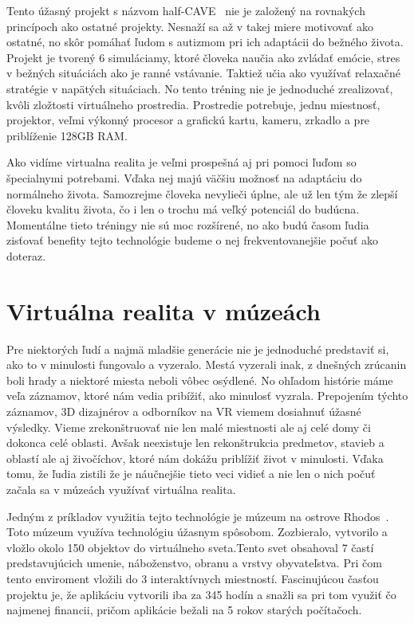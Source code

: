 \documentclass[10pt,oneside,slovak,a4paper]{article}
\begin{document}
Tento úžasný projekt s názvom half-CAVE~\cite{Autism} nie je založený na rovnakých princípoch ako ostatné projekty. Nesnaží sa až v takej miere motivovať ako ostatné, no skôr pomáhať ľudom s autizmom pri ich adaptácii do bežného života. Projekt je tvorený 6 simuláciamy, ktoré človeka naučia ako zvládať emócie, stres v bežných situáciách ako je ranné vstávanie. Taktiež učia ako využívať relaxačné stratégie v napätých situáciach. No tento tréning nie je jednoduché zrealizovať, kvôli zložtosti virtuálneho prostredia. Prostredie potrebuje, jednu miestnosť, projektor, veľmi výkonný procesor a grafickú kartu, kameru, zrkadlo a pre priblíženie 128GB RAM. 

Ako vidíme virtualna realita je veľmi prospešná aj pri pomoci ľuďom so špecialnymi potrebami. Vďaka nej majú väčšiu možnosť na adaptáciu do normálneho života. Samozrejme človeka nevylieči úplne, ale už len tým že zlepší človeku kvalitu života, čo i len o trochu má veľký potenciál do budúcna. Momentálne tieto tréningy nie sú moc rozšírené, no ako budú časom ľudia zisťovať benefity tejto technológie budeme o nej frekventovanejšie počuť ako doteraz.   

\section{Virtuálna realita v múzeách} \label{muzea}
Pre niektorých ľudí a najmä mladšie generácie nie je jednoduché predstaviť si, ako to v minulosti fungovalo a vyzeralo. Mestá vyzerali inak, z dnešných zrúcanin boli hrady a niektoré miesta neboli vôbec osýdlené. No ohľadom histórie máme veľa záznamov, ktoré nám vedia pribížiť, ako minulosť vyzrala. Prepojením týchto záznamov, 3D dizajnérov a odborníkov na VR viemem dosiahnuť úžasné výsledky. Vieme zrekonštruovať nie len malé miestnosti ale aj celé domy či dokonca celé oblasti. Avšak neexistuje len rekonštrukcia predmetov, stavieb a oblastí ale aj živočíchov, ktoré nám dokážu priblížiť život v minulosti. Vďaka tomu, že ľudia zistili že je náučnejšie tieto veci vidieť a nie len o nich počuť začala sa v múzeách využívať virtuálna realita.

Jedným z príkladov využitia tejto technológie je múzeum na ostrove Rhodos~\cite{Muzeum}. Toto múzeum využíva technológiu úžasnym spôsobom. Zozbieralo, vytvorilo a vložlo okolo 150 objektov do virtuálneho sveta.Tento svet obsahoval 7 častí predstavujúcich umenie, náboženstvo, obranu a vrstvy obyvateľstva. Pri čom tento enviroment vložili do 3 interaktívnych miestností. Fascinujúcou časťou projektu je, že aplikáciu vytvorili iba za 345 hodín a snažli sa pri tom využiť čo najmenej financii, pričom aplikácie bežali na 5 rokov starých počítačoch.
\end{document}

